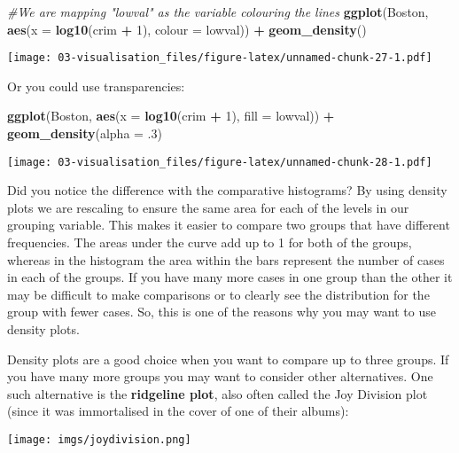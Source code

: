 \documentclass[
]{book}
\newenvironment{Shaded}{\begin{snugshade}}{\end{snugshade}}
\newcommand{\AttributeTok}[1]{\textcolor[rgb]{0.13,0.29,0.53}{#1}}
\newcommand{\CommentTok}[1]{\textcolor[rgb]{0.56,0.35,0.01}{\textit{#1}}}
\newcommand{\DecValTok}[1]{\textcolor[rgb]{0.00,0.00,0.81}{#1}}
\newcommand{\FunctionTok}[1]{\textcolor[rgb]{0.13,0.29,0.53}{\textbf{#1}}}
\newcommand{\NormalTok}[1]{#1}
\newcommand{\SpecialCharTok}[1]{\textcolor[rgb]{0.81,0.36,0.00}{\textbf{#1}}}
\begin{document}
\begin{Shaded}
\begin{Highlighting}[]
\CommentTok{\#We are mapping "lowval" as the variable colouring the lines }
\FunctionTok{ggplot}\NormalTok{(Boston, }\FunctionTok{aes}\NormalTok{(}\AttributeTok{x =} \FunctionTok{log10}\NormalTok{(crim }\SpecialCharTok{+} \DecValTok{1}\NormalTok{), }\AttributeTok{colour =}\NormalTok{ lowval)) }\SpecialCharTok{+} 
  \FunctionTok{geom\_density}\NormalTok{() }
\end{Highlighting}
\end{Shaded}

\texttt{[image: 03-visualisation\_files/figure-latex/unnamed-chunk-27-1.pdf]}

Or you could use transparencies:

\begin{Shaded}
\begin{Highlighting}[]
\FunctionTok{ggplot}\NormalTok{(Boston, }\FunctionTok{aes}\NormalTok{(}\AttributeTok{x =} \FunctionTok{log10}\NormalTok{(crim }\SpecialCharTok{+} \DecValTok{1}\NormalTok{), }\AttributeTok{fill =}\NormalTok{ lowval)) }\SpecialCharTok{+} 
  \FunctionTok{geom\_density}\NormalTok{(}\AttributeTok{alpha =}\NormalTok{ .}\DecValTok{3}\NormalTok{)}
\end{Highlighting}
\end{Shaded}

\texttt{[image: 03-visualisation\_files/figure-latex/unnamed-chunk-28-1.pdf]}

Did you notice the difference with the comparative histograms? By using density plots we are rescaling to ensure the same area for each of the levels in our grouping variable. This makes it easier to compare two groups that have different frequencies. The areas under the curve add up to 1 for both of the groups, whereas in the histogram the area within the bars represent the number of cases in each of the groups. If you have many more cases in one group than the other it may be difficult to make comparisons or to clearly see the distribution for the group with fewer cases. So, this is one of the reasons why you may want to use density plots.

Density plots are a good choice when you want to compare up to three groups. If you have many more groups you may want to consider other alternatives. One such alternative is the \textbf{ridgeline plot}, also often called the Joy Division plot (since it was immortalised in the cover of one of their albums):

\texttt{[image: imgs/joydivision.png]}
\end{document}
